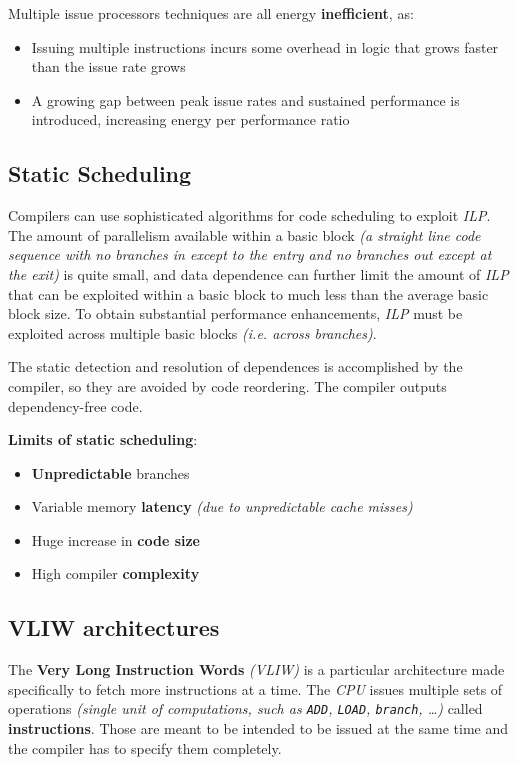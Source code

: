 \documentclass[english]{article}
\begin{document}

Multiple issue processors techniques are all energy \textbf{inefficient}, as:

\begin{itemize}
  \item Issuing multiple instructions incurs some overhead in logic that grows faster than the issue rate grows
  \item A growing gap between peak issue rates and sustained performance is introduced, increasing energy per performance ratio
\end{itemize}

\subsection{Static Scheduling}

Compilers can use sophisticated algorithms for code scheduling to exploit \textit{ILP}.
The amount of parallelism available within a basic block \textit{(a straight line code sequence with no branches in except to the entry and no branches out except at the exit)} is quite small, and
data dependence can further limit the amount of \textit{ILP} that can be exploited within a basic block to much less than the average basic block size.
To obtain substantial performance enhancements, \textit{ILP} must be exploited across multiple basic blocks \textit{(i.e. across branches)}.

The static detection and resolution of dependences is accomplished by the compiler, so they are avoided by code reordering.
The compiler outputs dependency-free code.

\bigskip
\textbf{Limits of static scheduling}:
\begin{itemize}
  \item \textbf{Unpredictable} branches
  \item Variable memory \textbf{latency} \textit{(due to unpredictable cache misses)}
  \item Huge increase in \textbf{code size}
  \item High compiler \textbf{complexity}
\end{itemize}

\subsection{VLIW architectures}

The \textbf{Very Long Instruction Words} \textit{(VLIW)} is a particular architecture made specifically to fetch more instructions at a time.
The \textit{CPU} issues multiple sets of operations \textit{(single unit of computations, such as \texttt{ADD}, \texttt{LOAD}, \texttt{branch}, \ldots) }called \textbf{instructions}.
Those are meant to be intended to be issued at the same time and the compiler has to specify them completely.
\end{document}
